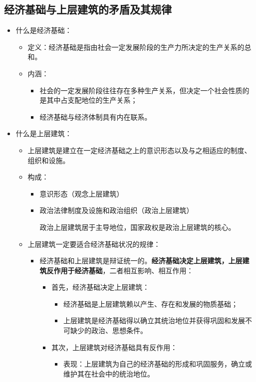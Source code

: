 \documentclass[12pt,openany]{ctexbook}
\begin{document}
\subsection{经济基础与上层建筑的矛盾及其规律}
\begin{itemize}
  \item 什么是经济基础：
\begin{itemize}
  \item 定义：经济基础是指由社会一定发展阶段的生产力所决定的生产关系的总和。
  \item 内涵：
\begin{itemize}
  \item 社会的一定发展阶段往往存在多种生产关系，但决定一个社会性质的是其中占支配地位的生产关系；
  \item 经济基础与经济体制具有内在联系。
\end{itemize}
\end{itemize}
  \item 什么是上层建筑：
\begin{itemize}
  \item 上层建筑是建立在一定经济基础之上的意识形态以及与之相适应的制度、组织和设施。
  \item 构成：
\begin{itemize}
  \item 意识形态（观念上层建筑）
  \item 政治法律制度及设施和政治组织（政治上层建筑）
  \par 政治上层建筑居于主导地位，国家政权是政治上层建筑的核心。
\end{itemize}
  \item 上层建筑一定要适合经济基础状况的规律：
\begin{itemize}
  \item 经济基础和上层建筑是辩证统一的。\textbf{经济基础决定上层建筑，上层建筑反作用于经济基础}，二者相互影响、相互作用：
\begin{itemize}
  \item 首先，经济基础决定上层建筑：
\begin{itemize}
  \item 经济基础是上层建筑赖以产生、存在和发展的物质基础；
  \item 上层建筑是经济基础得以确立其统治地位并获得巩固和发展不可缺少的政治、思想条件。
\end{itemize}
  \item 其次，上层建筑对经济基础具有反作用：
\begin{itemize}
  \item 表现：上层建筑为自己的经济基础的形成和巩固服务，确立或维护其在社会中的统治地位。

\end{itemize}
\end{itemize}
\end{itemize}
\end{itemize}
\end{itemize}
\end{document}
